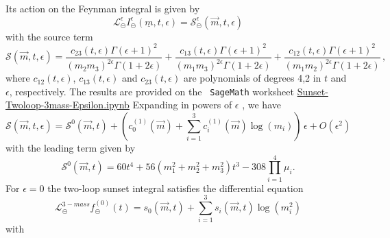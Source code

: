 \documentclass[a4paper,12pt]{article}
\numberwithin{equation}{section}
\numberwithin{figure}{section}
\def\su{\circleddash}
\begin{document}
Its action on the Feynman integral is given by 
\begin{equation}
     \mathscr{L}^{\epsilon}_\su  I_\su^\epsilon(\underline
     m,t,\epsilon)=\mathscr{S}^\epsilon_\su(\vec m,t,\epsilon) 
   \end{equation}
   with the source term
   \begin{equation}
     \mathscr{S}(\vec m,t,\epsilon)=\frac{c_{23}(t,\epsilon)\Gamma (\epsilon +1)^2}{ (m_{2} m_{3})^{2 \epsilon}\Gamma (1+2\epsilon)}+\frac{c_{13}(t,\epsilon)\Gamma (\epsilon +1)^2}{ (m_{1} m_{3})^{2 \epsilon }\Gamma (1+2
   \epsilon)}+\frac{c_{12}(t,\epsilon)\Gamma (\epsilon +1)^2}{ (m_{1} m_{2})^{2 \epsilon }\Gamma (1+2
   \epsilon )} \, , 
\end{equation}
where $c_{12}(t,\epsilon)$, $c_{13}(t,\epsilon)$ and
$c_{23}(t,\epsilon)$ are polynomials of degrees 4,2 in $t$ and
$\epsilon$, respectively. The results are provided on the {\tt
  SageMath} worksheet \href{Sunset-Twoloop-3mass-Epsilon.ipynb}{Sunset-Twoloop-3mass-Epsilon.ipynb}
%
Expanding in powers of $\epsilon$ , we have
%
\begin{equation}
    \mathscr{S}(\vec m,t,\epsilon)=\mathscr{S}^0(\vec m,t)
    +\left(c^{(1)}_0(\vec m)+
    \sum_{i=1}^3  c^{(1)}_i(\vec m)\log(m_i)\right)\,  \epsilon+O(\epsilon^2)
\end{equation}
with  the leading term given by
   \begin{equation}
   \mathscr{S}^0(\vec m,t)=60 t^{4}+56\left( m_{1}^{2}+ m_{2}^{2}+
     m_{3}^{2}\right) t^{3}
   -308 \prod_{i=1}^4 \mu_i.
 \end{equation}
For $\epsilon=0$ the two-loop sunset integral satisfies  the
differential equation~\cite{Adams:2013nia,Bloch:2016izu}
\begin{equation}
  \mathscr{L}^{3-mass}_\su f_\su^{(0)}(t)= s_0(\vec m,t)+ \sum_{i=1}^3
  s_i(\vec m,t)\log(m_i^2)  
\end{equation}
with 
\end{document}
